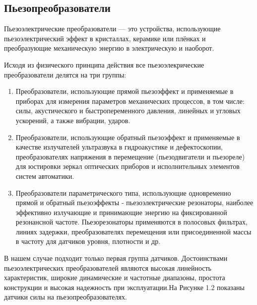 \documentclass[a4paper,14pt,russian]{extreport} \usepackage{extsizes}
\begin{document}
	\subsection {Пьезопреобразователи}
	Пьезоэлектрические преобразователи — это устройства, использующие пьезоэлектрический эффект в кристаллах, керамике или плёнках и преобразующие механическую энергию в электрическую и наоборот.
	
	Исходя из физического принципа действия все пьезоэлекрические преобразователи делятся на три группы:
	\begin{enumerate} 
		\item Преобразователи, использующие прямой пьезоэффект и применяемые в приборах для измерения параметров механических процессов, в том числе: силы, акустического и быстропеременного давления, линейных и угловых ускорений, а также вибрации, ударов.
	
		\item Преобразователи, использующие обратный пьезоэффект и применяемые в качестве излучателей ультразвука в гидроакустике и дефектоскопии, преобразователях напряжения в перемещение (пьезодвигатели и пьезореле) для юстировки зеркал оптических приборов и исполнительных элементов систем автоматики.
	
		\item Преобразователи параметрического типа, использующие одновременно прямой и обратный пьезоэффекты - пьезоэлектрические резонаторы, наиболее эффективно излучающие и принимающие энергию на фиксированной резонансной частоте. Пьезорезонаторы применяются в полосовых фильтрах, линиях задержки, преобразователях перемещения или присоединенной массы в частоту для датчиков уровня, плотности и др.
		
	\end{enumerate}
	В нашем случае подходит только первая группа датчиков. Достоинствами пьезоэлектрических преобразователей являются высокая линейность характеристик, широкие динамические и частотные диапазоны, простота конструкции и высокая надежность при эксплуатации.На Рисунке 1.2 показаны датчики силы на пьезопреобразователях.
\end{document}
